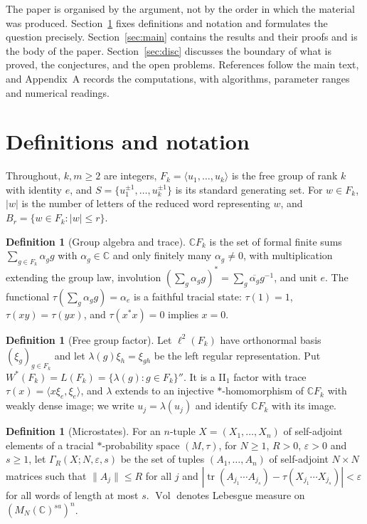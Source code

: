\documentclass[11pt]{article}
\theoremstyle{plain}
\theoremstyle{definition}
\newtheorem{definition}[theorem]{Definition}
\theoremstyle{remark}
\newcommand{\C}{\mathbb{C}}\newcommand{\N}{\mathbb{N}}
\newcommand{\tr}{\operatorname{tr}}
\newcommand{\Vol}{\operatorname{Vol}}
\begin{document}
The paper is organised by the argument, not by the order in which the material was produced. Section~\ref{sec:defs} fixes definitions and notation and formulates the question precisely. Section~\ref{sec:main} contains the results and their proofs and is the body of the paper. Section~\ref{sec:disc} discusses the boundary of what is proved, the conjectures, and the open problems. References follow the main text, and Appendix~A records the computations, with algorithms, parameter ranges and numerical readings.

\section{Definitions and notation}\label{sec:defs}

Throughout, $k,m\ge2$ are integers, $F_k=\langle u_1,\dots,u_k\rangle$ is the free group of rank $k$ with identity $e$, and $S=\{u_1^{\pm1},\dots,u_k^{\pm1}\}$ is its standard generating set. For $w\in F_k$, $|w|$ is the number of letters of the reduced word representing $w$, and $B_r=\{w\in F_k: |w|\le r\}$.

\begin{definition}[Group algebra and trace]\label{def:alg}
$\C F_k$ is the set of formal finite sums $\sum_{g\in F_k}\alpha_g g$ with $\alpha_g\in\C$ and only finitely many $\alpha_g\neq0$, with multiplication extending the group law, involution $(\sum_g\alpha_g g)^*=\sum_g\overline{\alpha_g}g^{-1}$, and unit $e$. The functional $\tau(\sum_g\alpha_g g)=\alpha_e$ is a faithful tracial state: $\tau(1)=1$, $\tau(xy)=\tau(yx)$, and $\tau(x^*x)=0$ implies $x=0$.
\end{definition}

\begin{definition}[Free group factor]\label{def:factor}
Let $\ell^2(F_k)$ have orthonormal basis $(\xi_g)_{g\in F_k}$ and let $\lambda(g)\xi_h=\xi_{gh}$ be the left regular representation. Put $W^*(F_k)=L(F_k)=\{\lambda(g):g\in F_k\}''$. It is a II$_1$ factor with trace $\tau(x)=\langle x\xi_e,\xi_e\rangle$, and $\lambda$ extends to an injective $*$-homomorphism of $\C F_k$ with weakly dense image; we write $u_j=\lambda(u_j)$ and identify $\C F_k$ with its image.
\end{definition}

\begin{definition}[Microstates]\label{def:micro}
For an $n$-tuple $X=(X_1,\dots,X_n)$ of self-adjoint elements of a tracial $*$-probability space $(M,\tau)$, for $N\ge1$, $R>0$, $\varepsilon>0$ and $s\ge1$, let $\Gamma_R(X;N,\varepsilon,s)$ be the set of tuples $(A_1,\dots,A_n)$ of self-adjoint $N\times N$ matrices such that $\|A_j\|\le R$ for all $j$ and $|\tr(A_{j_1}\cdots A_{j_s})-\tau(X_{j_1}\cdots X_{j_s})|<\varepsilon$ for all words of length at most $s$. $\Vol$ denotes Lebesgue measure on $(M_N(\C)^{sa})^n$.
\end{definition}
\end{document}
